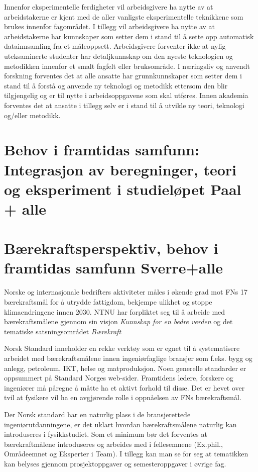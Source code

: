 \documentclass{article}
\begin{document}
Innenfor eksperimentelle ferdigheter vil arbeidsgivere ha nytte av at arbeidstakerne er kjent med de aller vanligste eksperimentelle teknikkene som brukes innenfor fagområdet.
I tillegg vil arbeidsgivere ha nytte av at arbeidstakerne har kunnskaper som setter dem i stand til å sette opp automatisk datainnsamling fra et måleoppsett.
Arbeidsgivere forventer ikke at nylig uteksaminerte studenter har detaljkunnskap om den nyeste teknologien og metodikken innenfor et smalt fagfelt eller bruksområde.
I næringsliv og anvendt forskning forventes det at alle ansatte har grunnkunnskaper som setter dem i stand til å forstå og anvende ny teknologi og metodikk ettersom den blir tilgjengelig og er til nytte i arbeidsoppgavene som skal utføres.
Innen akademia forventes det at ansatte i tillegg selv er i stand til å utvikle ny teori, teknologi og/eller metodikk.

\section{Behov i framtidas samfunn: Integrasjon av beregninger, teori og eksperiment i studieløpet {\color{red} Paal + alle}}

\section{Bærekraftsperspektiv, behov i framtidas samfunn {\color{red} Sverre+alle}}
Norske og internasjonale bedrifters aktiviteter måles i økende grad mot FNs 17 bærekraftsmål for å utrydde fattigdom, bekjempe ulikhet og stoppe klimaendringene innen 2030\cite{FNsustgoals}.
NTNU har forpliktet seg til å arbeide med bærekraftsmålene gjennom sin visjon \emph{Kunnskap for en bedre verden} og det tematiske satsningsområdet \emph{Bærekraft} \cite{NTNUStrategi,NTNUBaerekraftMaal,NTNUBaerekraft}

Norsk Standard inneholder en rekke verktøy som er egnet til å systematisere arbeidet med bærekraftsmålene innen ingeniørfaglige bransjer som f.eks. bygg og anlegg, petroleum, IKT, helse og matproduksjon.
Noen generelle standarder er oppsummert på Standard Norges web-sider\cite{StandardNorge}.
Framtidens ledere, forskere og ingeniører må påregne å måtte ha et aktivt forhold til disse.
Det er hevet over tvil at fysikere vil ha en avgjørende rolle i oppnåelsen av FNs bærekraftsmål.

Der Norsk standard har en naturlig plass i de bransjerettede ingeniørutdanningene, er det uklart hvordan bærekraftsmålene naturlig kan introduseres i fysikkstudiet.
Som et minimum bør det forventes at bærekraftmålene introduseres og arbeides med i fellesemnene (Ex.phil., Områdeemnet og Eksperter i Team)\cite{NTNUFellesEmner}.
I tillegg kan man se for seg at tematikken kan belyses gjennom prosjektoppgaver og semesteroppgaver i øvrige fag.
\end{document}
